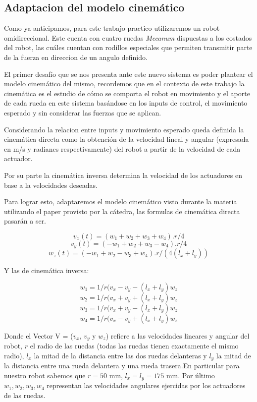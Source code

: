 \subsection{Adaptacion del modelo cinemático}
Como ya anticipamos, para este trabajo practico utilizaremos un robot omidireccional. Este cuenta con cuatro ruedas  \textit{Mecanum} dispuestas a los costados del robot, las cuáles cuentan con rodillos especiales que permiten transmitir parte de la fuerza en direccion de un angulo definido.  %


El primer desafío que se nos presenta ante este nuevo sistema es poder plantear el modelo cinemático del mismo, recordemos que en el contexto de este trabajo la cinemática es el estudio de cómo se comporta el robot en movimiento y el aporte de cada rueda en este sistema basándose en los inputs de control, el movimiento esperado y sin considerar las fuerzas que se aplican.

Considerando la relacion entre inputs y movimiento esperado queda definida la cinemática directa como la obtención de la velocidad lineal y angular (expresada en m/s y radianes respectivamente) del robot a partir de la velocidad de cada actuador.

Por su parte la cinemática inversa determina la velocidad de los actuadores en base a la velocidades deseadas.

Para lograr esto, adaptaremos el modelo cinemático visto durante la materia utilizando el paper provisto por la cátedra, las formulas de cinemática directa pasarán a ser.

$$v_x(t)=(w_1+w_2+w_3+w_4).r/4$$
$$v_y(t)=(-w_1+w_2+w_3-w_4).r/4$$
$$w_z(t)=(-w_1+w_2-w_3+w_4).r/(4(l_x+l_y))$$


Y las de cinemática inversa:

$$ w_1 = 1/r (v_x - v_y - (l_x + l_y)w_z$$
$$ w_2 = 1/r (v_x + v_y + (l_x + l_y)w_z$$
$$ w_3 = 1/r (v_x + v_y - (l_x + l_y)w_z$$
$$ w_4 = 1/r (v_x - v_y + (l_x + l_y)w_z$$

Donde el Vector V = ($v_x$, $v_y$ y $w_z$) refiere a las velocidades lineares y angular del robot, $r$ el radio de las ruedas (todas las ruedas tienen exactamente el mismo radio), $l_x$ la mitad de la distancia entre las dos ruedas delanteras y $l_y$ la mitad de la distancia entre una rueda delantera y una rueda trasera.En particular para nuestro robot sabemos que $r =50 $ mm, $l_x = l_y = 175 $ mm. Por último $w_1,w_2,w_3,w_4$ representan las velocidades angulares ejercidas por los actuadores de las ruedas.

